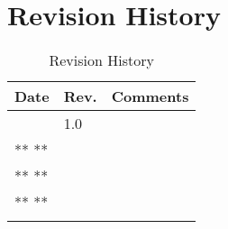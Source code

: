 \section{Revision History}

\begin{longtable}[]{@{}lll@{}}
\toprule
\textbf{Date} & \textbf{Rev.} & \textbf{Comments}\tabularnewline
\midrule
\endhead
& 1.0 &\tabularnewline
** ** & &\tabularnewline
** ** & &\tabularnewline
** ** & &\tabularnewline
\bottomrule
\caption{Revision History}
\label{tab:REVS}
\end{longtable}